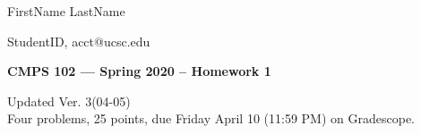 \documentclass[11pt]{article}
\begin{document}
\hfill FirstName  LastName  

\hfill StudentID, acct@ucsc.edu

\begin{center}
{\bf\Large 
CMPS 102 --- Spring 2020 --  Homework 1 }
\end{center}

\begin{center}
Updated Ver. 3(04-05)\\
Four problems, 25 points, due Friday April 10 (11:59 PM) on Gradescope. 
\end{center}

\end{document}
